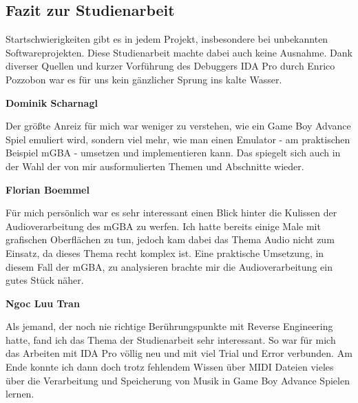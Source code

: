 \documentclass[11pt,a4paper]{scrartcl}
\newcommand{\paratitle}[1] {
    \vspace{5mm}
    \large \textbf{#1} \normalsize
    \vspace{2mm}\newline
}
\begin{document}

\subsection{Fazit zur Studienarbeit}
Startschwierigkeiten gibt es in jedem Projekt, insbesondere bei unbekannten Softwareprojekten. Diese Studienarbeit machte dabei auch keine Ausnahme. Dank diverser Quellen und kurzer Vorf\"uhrung des Debuggers IDA Pro durch Enrico Pozzobon war es f\"ur uns kein g\"anzlicher Sprung ins kalte Wasser.

\vspace{-2mm}
\paratitle{Dominik Scharnagl}
Der gr\"o{\ss}te Anreiz f\"ur mich war weniger zu verstehen, wie ein Game Boy Advance Spiel emuliert wird, sondern viel mehr, wie man einen Emulator - am praktischen Beispiel mGBA - umsetzen und implementieren kann. Das spiegelt sich auch in der Wahl der von mir ausformulierten Themen und Abschnitte wieder.

\vspace{-2mm}
\paratitle{Florian Boemmel}
F\"ur mich pers\"onlich war es sehr interessant einen Blick hinter die Kulissen der Audioverarbeitung des mGBA zu werfen. Ich hatte bereits einige Male mit grafischen Oberfl\"achen zu tun, jedoch kam dabei das Thema Audio nicht zum Einsatz, da dieses Thema recht komplex ist. Eine praktische Umsetzung, in diesem Fall der mGBA, zu analysieren brachte mir die Audioverarbeitung ein gutes St\"uck n\"aher. 

\vspace{-2mm}
\paratitle{Ngoc Luu Tran}
Als jemand, der noch nie richtige Ber\"uhrungspunkte mit Reverse Engineering hatte, fand ich das Thema der Studienarbeit sehr interessant. So war f\"ur mich das Arbeiten mit IDA Pro v\"ollig neu und mit viel Trial und Error verbunden. Am Ende konnte ich dann doch trotz fehlendem Wissen \"uber MIDI Dateien vieles \"uber die Verarbeitung und Speicherung von Musik in Game Boy Advance Spielen lernen.


\newpage
{}
\end{document}
